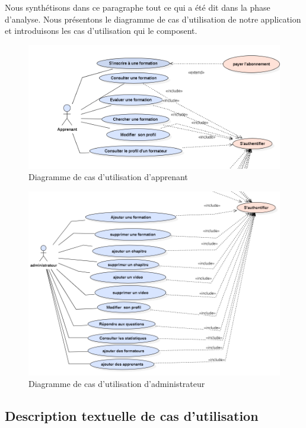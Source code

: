Nous synthétisons dans ce paragraphe tout ce qui a été dit dans la phase d’analyse. Nous présentons le diagramme de cas d’utilisation de notre application et introduisons les cas d’utilisation qui le composent.

\begin{figure}[H]
    \centering
    \includegraphics[width=15cm]{Figures/apprenant.PNG}
    \caption{Diagramme de cas d’utilisation d'apprenant}
\end{figure}

\begin{figure}[H]
    \centering
    \includegraphics[width=13cm]{Figures/administrateur.PNG}
    \caption{Diagramme de cas d’utilisation d'administrateur}
\end{figure}

\subsection{Description textuelle de cas d’utilisation}

